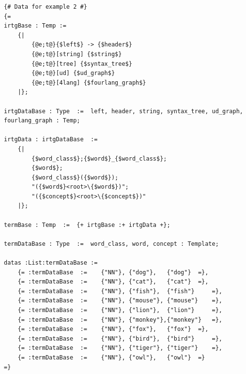 \begin{verbatim}
{# Data for example 2 #}
{= 
irtgBase : Temp := 
	{|
		{@e;t@}{$left$} -> {$header$}
		{@e;t@}[string] {$string$}
		{@e;t@}[tree] {$syntax_tree$}
		{@e;t@}[ud] {$ud_graph$}
		{@e;t@}[4lang] {$fourlang_graph$}
	|};

irtgDataBase : Type  :=  left, header, string, syntax_tree, ud_graph, fourlang_graph : Temp;

irtgData : irtgDataBase  :=  
	{|
		{$word_class$};{$word$}_{$word_class$};
		{$word$};
		{$word_class$}({$word$});
		"({$word$}<root>\{$word$})";
		"({$concept$}<root>\{$concept$})"
	|};

termBase : Temp  :=  {+ irtgBase :+ irtgData +};

termDataBase : Type  :=  word_class, word, concept : Template;

datas :List:termDataBase :=
	{= :termDataBase  := 	{"NN"}, {"dog"},   {"dog"} 	=},
	{= :termDataBase  := 	{"NN"}, {"cat"},   {"cat"} 	=},
	{= :termDataBase  := 	{"NN"}, {"fish"},  {"fish"} 	=},
	{= :termDataBase  := 	{"NN"}, {"mouse"}, {"mouse"} 	=},
	{= :termDataBase  :=	{"NN"}, {"lion"},  {"lion"} 	=},
	{= :termDataBase  := 	{"NN"}, {"monkey"},{"monkey"} 	=},
	{= :termDataBase  := 	{"NN"}, {"fox"},   {"fox"} 	=},
	{= :termDataBase  := 	{"NN"}, {"bird"},  {"bird"} 	=},
	{= :termDataBase  := 	{"NN"}, {"tiger"}, {"tiger"} 	=},
	{= :termDataBase  := 	{"NN"}, {"owl"},   {"owl"} 	=}
=}

\end{verbatim}

